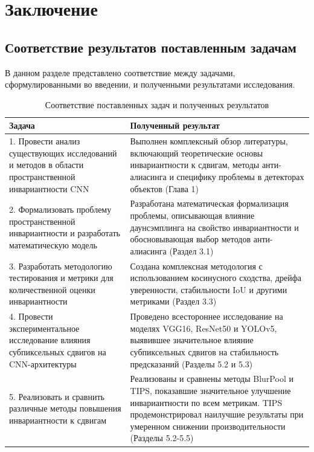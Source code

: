 \section{Заключение}
\label{sec:Chapter5} 

\subsection{Соответствие результатов поставленным задачам}
\label{sec:task_results}

В данном разделе представлено соответствие между задачами, сформулированными во введении, и полученными результатами исследования.

\begin{table}[ht]
\centering
\caption{Соответствие поставленных задач и полученных результатов}
\label{tab:tasks_results}
\begin{tabular}{|p{}|p{}|}
\hline
\textbf{Задача} & \textbf{Полученный результат} \\ \hline
1. Провести анализ существующих исследований и методов в области пространственной инвариантности CNN & Выполнен комплексный обзор литературы, включающий теоретические основы инвариантности к сдвигам, методы анти-алиасинга и специфику проблемы в детекторах объектов (Глава 1) \\ \hline
2. Формализовать проблему пространственной инвариантности и разработать математическую модель & Разработана математическая формализация проблемы, описывающая влияние даунсэмплинга на свойство инвариантности и обосновывающая выбор методов анти-алиасинга (Раздел 3.1) \\ \hline
3. Разработать методологию тестирования и метрики для количественной оценки инвариантности & Создана комплексная методология с использованием косинусного сходства, дрейфа уверенности, стабильности IoU и другими метриками (Раздел 3.3) \\ \hline
4. Провести экспериментальное исследование влияния субпиксельных сдвигов на CNN-архитектуры & Проведено всестороннее исследование на моделях VGG16, ResNet50 и YOLOv5, выявившее значительное влияние субпиксельных сдвигов на стабильность предсказаний (Разделы 5.2 и 5.3) \\ \hline
5. Реализовать и сравнить различные методы повышения инвариантности к сдвигам & Реализованы и сравнены методы BlurPool и TIPS, показавшие значительное улучшение инвариантности по всем метрикам. TIPS продемонстрировал наилучшие результаты при умеренном снижении производительности (Разделы 5.2-5.5) \\ \hline

\end{tabular}
\end{table}
